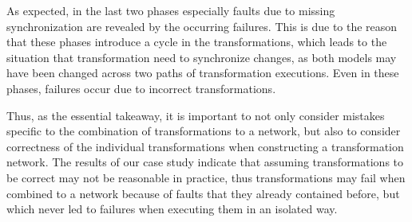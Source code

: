 As expected, in the last two phases especially faults due to missing synchronization are revealed by the occurring failures.
This is due to the reason that these phases introduce a cycle in the transformations, which leads to the situation that transformation need to synchronize changes, as both models may have been changed across two paths of transformation executions.
Even in these phases, failures occur due to incorrect transformations.

Thus, as the essential takeaway, it is important to not only consider mistakes specific to the combination of transformations to a network, but also to consider correctness of the individual transformations when constructing a transformation network.
The results of our case study indicate that assuming transformations to be correct may not be reasonable in practice, thus transformations may fail when combined to a network because of faults that they already contained before, but which never led to failures when executing them in an isolated way.







